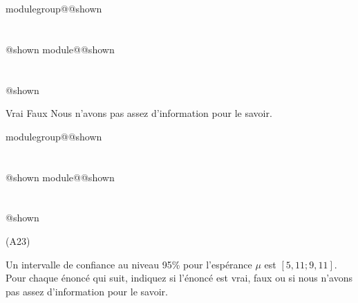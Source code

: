 \documentclass{Evaluation}
\makeatletter
\newcommand{\currentmodulekey}{}
\newcommand{\currentmoduletitle}{}
\newcommand{\currentgroupkey}{}
\newcommand{\currentgrouptitle}{}
\newcommand{\showmoduleifneeded}{%
  \ifx\currentgroupkey\empty\else
    \expandafter\ifx\csname modulegroup@\currentgroupkey @shown\endcsname\relax
      \section*{\currentgrouptitle}%
      \expandafter\gdef\csname modulegroup@\currentgroupkey @shown\endcsname{1}%
    \fi
  \fi
  \expandafter\ifx\csname module@\currentmodulekey @shown\endcsname\relax
    \section*{\currentmoduletitle}%
    \expandafter\gdef\csname module@\currentmodulekey @shown\endcsname{1}%
  \fi
}
\newenvironment{H23}{\showmoduleifneeded}{}
\newenvironment{A23}{\showmoduleifneeded}{}
\makeatother
\begin{document}
\begin{questions}
\begin{H23}
\begin{parts}
\medskip   \begin{oneparcheckboxes}
        \choice Vrai 
        \CorrectChoice Faux
        \choice Nous n'avons pas assez d'information pour le savoir.
\medskip    \end{oneparcheckboxes}
    


\end{parts}

\vspace{1cm}
\end{H23}

\begin{A23}
\question
(A23)

\medskip

Un intervalle de confiance au niveau 95\% pour l'espérance $\mu$ est $[ 5,11 ; 9,11]$. Pour chaque énoncé qui suit, indiquez si l'énoncé est vrai, faux ou si nous n'avons pas assez d'information pour le savoir.

\medskip

\end{A23}
\end{questions}
\end{document}
